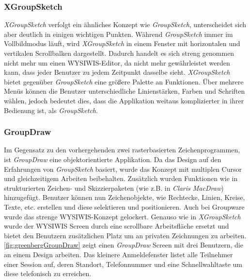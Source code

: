 \subsubsection{XGroupSketch} 
\emph{XGroupSketch} verfolgt ein ähnliches Konzept wie \emph{GroupSketch}, unterscheidet sich aber deutlich in einigen wichtigen Punkten. Während \emph{GroupSketch} immer im Vollbildmodus läuft, wird \emph{XGroupSketch} in einem Fenster mit horizontalen und vertikalen Scrollbalken dargestellt. Dadurch handelt es sich streng genommen nicht mehr um einen WYSIWIS-Editor, da nicht mehr gewährleistet werden kann, dass jeder Benutzer zu jedem Zeitpunkt dasselbe sieht. \emph{XGroupSketch} bietet gegenüber \emph{GroupSketch} eine größere Palette an Funktionen. Über mehrere Menüs können die Benutzer unterschiedliche Linienstärken, Farben und Schriften wählen, jedoch bedeutet dies, dass die Applikation weitaus komplizierter in ihrer Bedienung ist, als \emph{GroupSketch}.

\subsubsection{GroupDraw} 
Im Gegensatz zu den vorhergehenden zwei rasterbasierten Zeichenprogrammen, ist \emph{GroupDraw} eine objektorientierte Applikation. Da das Design auf den Erfahrungen von \emph{GroupSketch} basiert, wurde das Konzept mit multiplen Cursor und gleichzeitigem Arbeiten beibehalten. Zusätzlich wurden Funktionen wie in strukturierten Zeichen- und Skizzierpaketen (wie z.B. in \emph{Claris MacDraw}) hinzugefügt. Benutzer können nun Zeichenobjekte, wie Rechtecke, Linien, Kreise, Texte, etc. erstellen und diese selektieren und positionieren. Auch bei Groupware wurde das strenge WYSIWIS-Konzept gelockert. Genauso wie in \emph{XGroupSketch} wurde der WYSIWIS Screen durch eine scrollbare Arbeitsfläche ersetzt und bietet den Benutzern zusätzlichen Platz um an privaten Zeichnungen zu arbeiten. \autoref{fig:greenbergGroupDraw} zeigt einen \emph{GroupDraw} Screen mit drei Benutzern, die an einem Design arbeiten. Das kleinere Anmeldefenster listet alle Teilnehmer einer Session auf, deren Standort, Telefonnummer und eine Schnellwahltaste um diese telefonisch zu erreichen.

